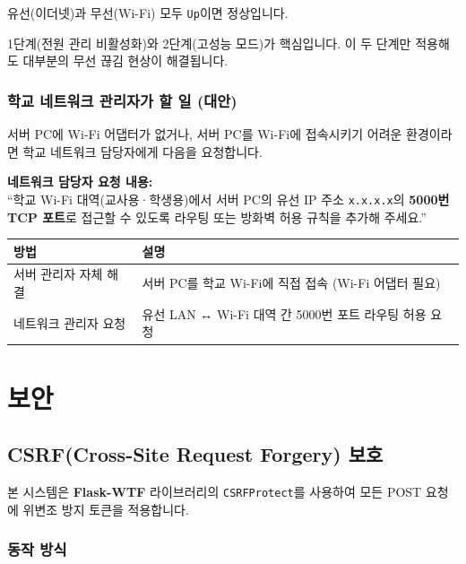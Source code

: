 \documentclass[a4paper,12pt]{article}
\begin{document}
유선(이더넷)과 무선(Wi-Fi) 모두 \texttt{Up}이면 정상입니다.

\begin{tipbox}
  1단계(전원 관리 비활성화)와 2단계(고성능 모드)가 핵심입니다.
  이 두 단계만 적용해도 대부분의 무선 끊김 현상이 해결됩니다.
\end{tipbox}

\subsubsection{학교 네트워크 관리자가 할 일 (대안)}

서버 PC에 Wi-Fi 어댑터가 없거나, 서버 PC를 Wi-Fi에 접속시키기 어려운 환경이라면
학교 네트워크 담당자에게 다음을 요청합니다.

\begin{notebox}
  \textbf{네트워크 담당자 요청 내용:}\\
  ``학교 Wi-Fi 대역(교사용·학생용)에서 서버 PC의 유선 IP 주소 \texttt{x.x.x.x}의
  \textbf{5000번 TCP 포트}로 접근할 수 있도록 라우팅 또는 방화벽 허용 규칙을 추가해 주세요.''
\end{notebox}

\begin{center}
\begin{tabular}{lp{9cm}}
\toprule
\textbf{방법} & \textbf{설명} \\
\midrule
서버 관리자 자체 해결 & 서버 PC를 학교 Wi-Fi에 직접 접속 (Wi-Fi 어댑터 필요) \\
네트워크 관리자 요청 & 유선 LAN ↔ Wi-Fi 대역 간 5000번 포트 라우팅 허용 요청 \\
\bottomrule
\end{tabular}
\end{center}

\section{보안}

\subsection{CSRF(Cross-Site Request Forgery) 보호}

본 시스템은 \textbf{Flask-WTF} 라이브러리의 \texttt{CSRFProtect}를 사용하여 모든 POST 요청에
위변조 방지 토큰을 적용합니다.

\subsubsection{동작 방식}
\end{document}

